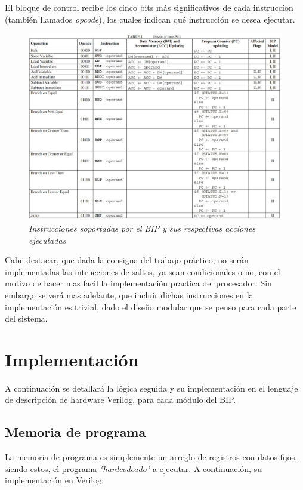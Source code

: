 \documentclass{article}
\begin{document}
El bloque de control recibe los cinco bits más significativos de cada instruccíon (también llamados \textit{opcode}),
los cuales indican qué instrucción se desea ejecutar.

\begin{figure}[H]
    \includegraphics[scale=0.5]{opcodes}
    \caption{\textit{Instrucciones soportadas por el BIP y sus respectivas acciones ejecutadas}}
\end{figure}

Cabe destacar, que dada la consigna del trabajo práctico, no serán implementadas las intrucciones de saltos,
ya sean condicionales o no, con el motivo de hacer mas facil la implementación practica del procesador.
Sin embargo se verá mas adelante, que incluir dichas instrucciones en la implementación es trivial, dado
el diseño modular que se penso para cada parte del sistema.

\newpage
\section{Implementación}

A continuación se detallará la lógica seguida y su implementación en el lenguaje de descripción de hardware Verilog,
para cada módulo del BIP.

\subsection{Memoria de programa}

La memoria de programa es simplemente un arreglo de registros con datos fijos, siendo estos, el programa
\textit{"hardcodeado"} a ejecutar. A continuación, su implementación en Verilog:
\end{document}
